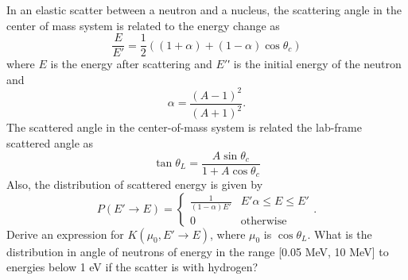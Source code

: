 \documentclass[12pt]{article}
\newenvironment{problem}[2][Problem]{\begin{trivlist}
\item[\hskip \labelsep {\bfseries #1}\hskip \labelsep {\bfseries #2:}]\hspace{0.3in}\newline\newline}{\end{trivlist}}
\begin{document}
\begin{problem}{2}
In an elastic scatter between a neutron and a nucleus, the scattering angle in the center of mass system is
related to the energy change as
\begin{equation}\label{eq:E}
 \frac{E}{E'} = \frac{1}{2}\left((1+\alpha) + (1-\alpha)\cos \theta_c\right)
\end{equation}
where $E$ is the energy after scattering and $E'$′ is the initial energy of the neutron and
\begin{equation}
\alpha = \frac{(A-1)^2}{(A+1)^2}.
\end{equation}
The scattered angle in the center-of-mass system is related the lab-frame scattered angle as
\begin{equation}
\tan \theta_L = \frac{A\sin \theta_c}{1 + A\cos \theta_c}
\end{equation}
Also, the distribution of scattered energy is given by
\begin{equation} \label{pdf}
P(E'\rightarrow E) = \left\{\begin{matrix}
\frac{1}{(1-\alpha)E'} & E'\alpha \leq E \leq E' \\ 
 0 & \text{otherwise}
\end{matrix}\right. .
\end{equation}
Derive an expression for $K( \mu_0, E'\rightarrow E)$, where $\mu_0$ is $\cos \theta_L$. What is the distribution in angle of neutrons of energy
in the range [0.05 MeV, 10 MeV] to energies below 1 eV if the scatter is with hydrogen?

\end{problem}
\end{document}
